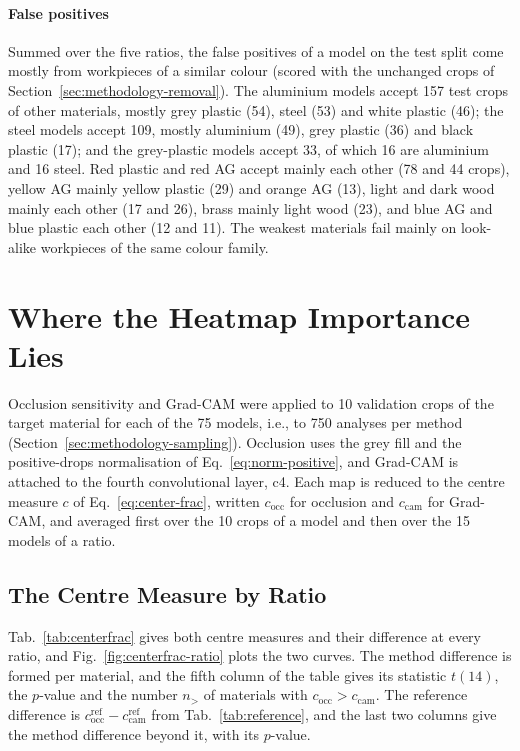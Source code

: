\paragraph{False positives}
Summed over the five ratios, the false positives of a model on the test split come
mostly from workpieces of a similar colour (scored with the unchanged crops of
Section~\ref{sec:methodology-removal}). The aluminium models accept 157 test crops of
other materials, mostly grey plastic (54), steel (53) and white plastic (46); the steel
models accept 109, mostly aluminium (49), grey plastic (36) and black plastic (17); and
the grey-plastic models accept 33, of which 16 are aluminium and 16 steel. Red plastic
and red AG accept mainly each other (78 and 44 crops), yellow AG mainly yellow plastic
(29) and orange AG (13), light and dark wood mainly each other (17 and 26), brass
mainly light wood (23), and blue AG and blue plastic each other (12 and 11). The weakest
materials fail mainly on look-alike workpieces of the same colour family.

\FloatBarrier
\section{Where the Heatmap Importance Lies}
\label{sec:results-divergence}

Occlusion sensitivity and Grad-CAM were applied to 10 validation crops of the target
material for each of the 75 models, i.e., to 750 analyses per method
(Section~\ref{sec:methodology-sampling}). Occlusion uses the grey fill and the
positive-drops normalisation of Eq.~\eqref{eq:norm-positive}, and Grad-CAM is attached
to the fourth convolutional layer, c4. Each map is reduced to the centre measure $c$
of Eq.~\eqref{eq:center-frac}, written $c_{\mathrm{occ}}$ for occlusion and
$c_{\mathrm{cam}}$ for Grad-CAM, and averaged first over the 10 crops of a model and
then over the 15 models of a ratio.

\subsection{The Centre Measure by Ratio}
\label{sec:results-centre}

Tab.~\ref{tab:centerfrac} gives both centre measures and their difference at every
ratio, and Fig.~\ref{fig:centerfrac-ratio} plots the two curves. The method
difference is formed per material, and the fifth column of the table gives its statistic
$t(14)$, the $p$-value and the number $n_>$ of materials with
$c_{\mathrm{occ}} > c_{\mathrm{cam}}$. The reference difference is
$c^{\mathrm{ref}}_{\mathrm{occ}} - c^{\mathrm{ref}}_{\mathrm{cam}}$ from
Tab.~\ref{tab:reference}, and the last two columns give the method difference beyond
it, with its $p$-value.


